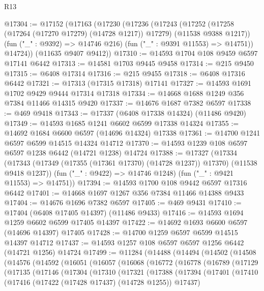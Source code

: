\begin{lexlean}{R13}
\begin{coremodule}
@17304 := @17152
    (@17163
      (@17230
        (@17236
          (@17243
            (@17252 (@17258 (@17264 (@17270 @17279) (@14728 @1217)) @17279) (@11538 @9388 @1217))
            (fun ("_" : @9392) => @14746 @216)
            (fun ("_" : @9391 @11553) => @14751))
          @14724))
      (@11635 @9407 @9412))
@17310 := @14593 @1704 @108 @9459 @6597 @17141 @6442
@17313 := @14581 @1703 @9445 @9458
@17314 := @215 @9450
@17315 := @6408 @17314
@17316 := @215 @9455
@17318 := @6408 @17316 @6442
@17321 := @17313 (@17315 @17318) @17141
@17327 := @14593 @1691 @1702 @9429 @9444 @17314 @17318
@17334 := @14668 @1688 @1249 @356 @7384 @11466 @14315 @9420
@17337 := @14676 @1687 @7382 @6597
@17338 := @469 @9418
@17343 := @17337 (@6408 @17338 @14324) (@11486 @9420)
@17349 := @14593 @1685 @1241 @6602 @6599 @17338 @14324
@17355 := @14692 @1684 @6600 @6597 (@14696 @14324) @17338
@17361 := @14700 @1241 @6597 @6599 @14515 @14324 @14712
@17370 := @14593 @1239 @108 @6597 @6597 @1238 @6442 (@14721 @1238) @14724
@17388 := @17327
    (@17334
      (@17343 (@17349 (@17355 (@17361 @17370) (@14728 @1237)) @17370) (@11538 @9418 @1237))
      (fun ("_" : @9422) => @14746 @1248)
      (fun ("_" : @9421 @11553) => @14751))
@17394 := @14593 @1700 @108 @9442 @6597 @17316 @6442
@17401 := @14668 @1697 @1267 @356 @7384 @11466 @14388 @9433
@17404 := @14676 @1696 @7382 @6597
@17405 := @469 @9431
@17410 := @17404 (@6408 @17405 @14397) (@11486 @9433)
@17416 := @14593 @1694 @1259 @6602 @6599 @17405 @14397
@17422 := @14692 @1693 @6600 @6597 (@14696 @14397) @17405
@17428 := @14700 @1259 @6597 @6599 @14515 @14397 @14712
@17437 := @14593 @1257 @108 @6597 @6597 @1256 @6442 (@14721 @1256) @14724
@17499 := @11284
    (@14488
      (@14494
        (@14502
          (@14508
            (@14576
              (@14592
                (@16051
                  (@16057
                    (@16068
                      (@16772
                        (@16778
                          (@16789
                            (@17129
                              (@17135
                                (@17146
                                  (@17304
                                    (@17310
                                      (@17321
                                        (@17388
                                          (@17394
                                            (@17401
                                              (@17410
                                                (@17416
                                                  (@17422 (@17428 @17437) (@14728 @1255))
                                                  @17437)

\end{coremodule}
\end{lexlean}
